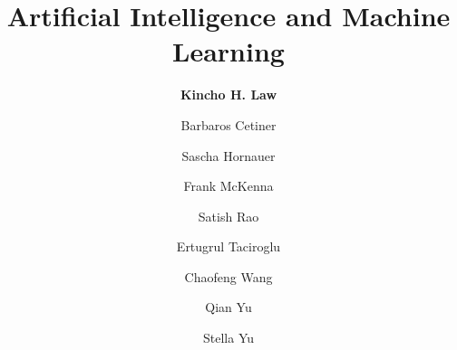 %
%
%


%
%
%
%
%
%
%
%

\title{Artificial Intelligence and Machine Learning}
\author{
    \textbf{Kincho H. Law}
    \and {Barbaros Cetiner}
    \and {Sascha Hornauer}
    \and {Frank McKenna}
    \and {Satish Rao}
    \and {Ertugrul Taciroglu}
    \and {Chaofeng Wang}
    \and {Qian Yu}
    \and {Stella Yu}}
\tocauthor{}
%
%
\maketitle


